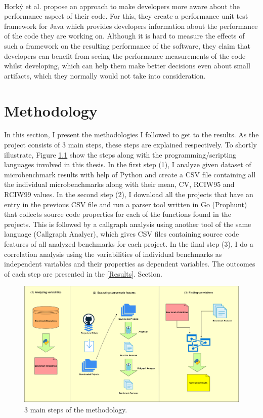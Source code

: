 \documentclass{seal_thesis}
\begin{document}
\\
Hork\'{y} et al. \cite{Horky:2015:UPU:2668930.2688051} propose an approach to make developers more aware about the performance aspect of their code. For this, they create a performance unit test framework for Java which provides developers information about the performance of the code they are working on. Although it is hard to measure the effects of such a framework on the resulting performance of the software, they claim that developers can benefit from seeing the performance measurements of the code whilst developing, which can help them make better decisions even about small artifacts, which they normally would not take into consideration.\\

\chapter{Methodology}
\label{Methodology}
In this section, I present the methodologies I followed to get to the results. As the project consists of 3 main steps, these steps are explained respectively. To shortly illustrate, Figure \ref{fig:Methodology} show the steps along with the programming/scripting languages involved in this thesis. In the first step (1), I analyze given dataset of microbenchmark results with help of Python and create a CSV file containing all the individual microbenchmarks along with their mean, CV, RCIW95 and RCIW99 values. In the second step (2), I download all the projects that have an entry in the previous CSV file and run a parser tool written in Go (Prophunt) that collects source code properties for each of the functions found in the projects. This is followed by a callgraph analysis using another tool of the same language (Callgraph Analyer), which gives CSV files containing source code features of all analyzed benchmarks for each project. In the final step (3), I do a correlation analysis using the variabilities of individual benchmarks as independent variables and their properties as dependent variables. The outcomes of each step are presented in the \ref{Results}. Section.

\begin{figure}[H]
	\centering
	\includegraphics[width=\linewidth]{Methodology}
	\caption{3 main steps of the methodology.}
	\label{fig:Methodology}
\end{figure}
\end{document}
